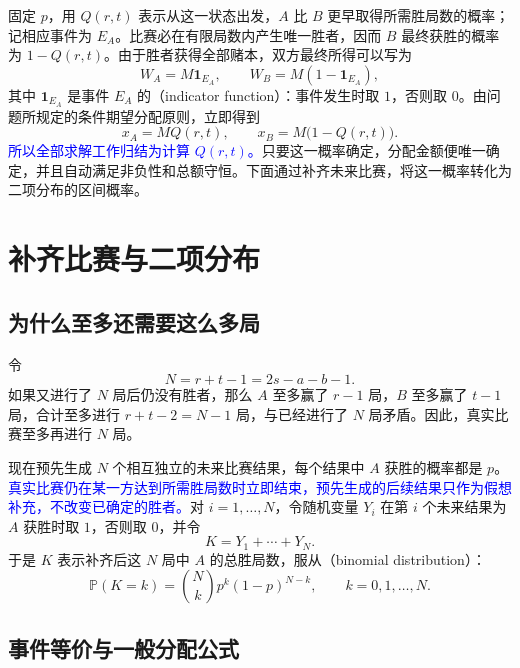 \documentclass[UTF8]{ctexart}
\begin{document}
固定 $p$，用 $Q(r,t)$ 表示从这一状态出发，$A$ 比 $B$ 更早取得所需胜局数的概率；记相应事件为 $E_A$。比赛必在有限局数内产生唯一胜者，因而 $B$ 最终获胜的概率为 $1-Q(r,t)$。由于胜者获得全部赌本，双方最终所得可以写为
\[
  W_A=M\mathbf 1_{E_A},\qquad W_B=M(1-\mathbf 1_{E_A}),
\]
其中 $\mathbf 1_{E_A}$ 是事件 $E_A$ 的（indicator function）：事件发生时取 $1$，否则取 $0$。由问题所规定的条件期望分配原则，立即得到
\begin{equation}
  x_A=M Q(r,t),\qquad x_B=M\bigl(1-Q(r,t)\bigr).
  \label{eq:points-allocation}
\end{equation}
\textcolor{blue}{所以全部求解工作归结为计算 $Q(r,t)$。}只要这一概率确定，分配金额便唯一确定，并且自动满足非负性和总额守恒。下面通过补齐未来比赛，将这一概率转化为二项分布的区间概率。

\section{补齐比赛与二项分布}
\label{sec:points-binomial}

\subsection{为什么至多还需要这么多局}

令
\begin{equation}
  N=r+t-1=2s-a-b-1.
  \label{eq:points-horizon}
\end{equation}
如果又进行了 $N$ 局后仍没有胜者，那么 $A$ 至多赢了 $r-1$ 局，$B$ 至多赢了 $t-1$ 局，合计至多进行 $r+t-2=N-1$ 局，与已经进行了 $N$ 局矛盾。因此，真实比赛至多再进行 $N$ 局。

现在预先生成 $N$ 个相互独立的未来比赛结果，每个结果中 $A$ 获胜的概率都是 $p$。\textcolor{blue}{真实比赛仍在某一方达到所需胜局数时立即结束，预先生成的后续结果只作为假想补充，不改变已确定的胜者。}对 $i=1,\ldots,N$，令随机变量 $Y_i$ 在第 $i$ 个未来结果为 $A$ 获胜时取 $1$，否则取 $0$，并令
\[
  K=Y_1+\cdots+Y_N.
\]
于是 $K$ 表示补齐后这 $N$ 局中 $A$ 的总胜局数，服从（binomial distribution）：
\begin{equation}
  \mathbb P(K=k)=\binom Nk p^k(1-p)^{N-k},
  \qquad k=0,1,\ldots,N.
  \label{eq:points-binomial-mass}
\end{equation}

\subsection{事件等价与一般分配公式}
\end{document}
